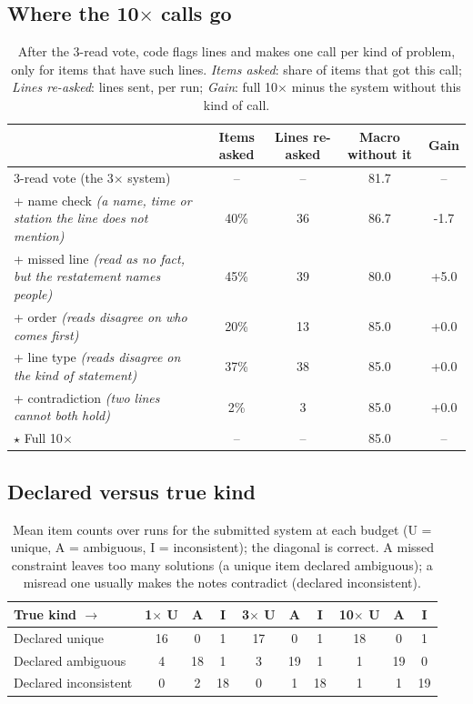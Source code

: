 \documentclass[10pt]{article}
\begin{document}
\subsection*{Where the 10$\times$ calls go}
\begin{table}[H]
\centering\footnotesize\setlength{\tabcolsep}{3.5pt}\renewcommand{\arraystretch}{1.08}
\begin{tabular}{@{}l cccc@{}}
\toprule
 & Items asked & Lines re-asked & Macro without it & Gain \\
\midrule
3-read vote (the 3$\times$ system) & -- & -- & 81.7 & -- \\
\quad + name check \textit{\footnotesize (a name, time or station the line does not mention)} & 40\% & 36 & 86.7 & -1.7 \\
\quad + missed line \textit{\footnotesize (read as no fact, but the restatement names people)} & 45\% & 39 & 80.0 & +5.0 \\
\quad + order \textit{\footnotesize (reads disagree on who comes first)} & 20\% & 13 & 85.0 & +0.0 \\
\quad + line type \textit{\footnotesize (reads disagree on the kind of statement)} & 37\% & 38 & 85.0 & +0.0 \\
\quad + contradiction \textit{\footnotesize (two lines cannot both hold)} & 2\% & 3 & 85.0 & +0.0 \\
$\star$ Full 10$\times$ & -- & -- & 85.0 & -- \\
\bottomrule
\end{tabular}
\caption{After the 3-read vote, code flags lines and makes one call per kind of problem, only for items that have such lines. \emph{Items asked}: share of items that got this call; \emph{Lines re-asked}: lines sent, per run; \emph{Gain}: full 10$\times$ minus the system without this kind of call.}
\end{table}

\subsection*{Declared versus true kind}
\begin{table}[H]
\centering\footnotesize\setlength{\tabcolsep}{3.5pt}\renewcommand{\arraystretch}{1.08}
\begin{tabular}{@{}l ccc ccc ccc@{}}
\toprule
True kind $\rightarrow$ & 1$\times$ U & A & I & 3$\times$ U & A & I & 10$\times$ U & A & I \\
\midrule
Declared unique & 16 & 0 & 1 & 17 & 0 & 1 & 18 & 0 & 1 \\
Declared ambiguous & 4 & 18 & 1 & 3 & 19 & 1 & 1 & 19 & 0 \\
Declared inconsistent & 0 & 2 & 18 & 0 & 1 & 18 & 1 & 1 & 19 \\
\bottomrule
\end{tabular}
\caption{Mean item counts over runs for the submitted system at each budget (U = unique, A = ambiguous, I = inconsistent); the diagonal is correct. A missed constraint leaves too many solutions (a unique item declared ambiguous); a misread one usually makes the notes contradict (declared inconsistent).}
\end{table}
\end{document}
